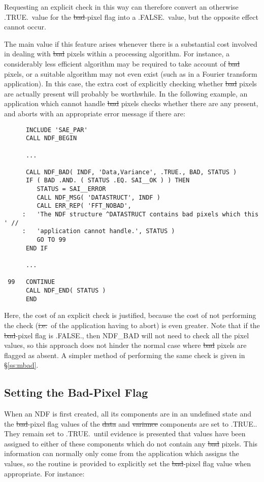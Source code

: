 Requesting an explicit check in this way can therefore convert an otherwise
.TRUE.\ value for the \st{bad\/}-pixel flag into a .FALSE.\ value, but the
opposite effect cannot occur. 

The main value if this feature arises whenever there is a substantial cost
involved in dealing with \st{bad\/} pixels within a processing algorithm. 
For instance, a considerably less efficient algorithm may be required to
take account of \st{bad\/} pixels, or a suitable algorithm may not even exist
(such as in a Fourier transform application).
In this case, the extra cost of explicitly checking whether \st{bad\/} pixels
are actually present will probably be worthwhile.
In the following example, an application which cannot handle \st{bad\/} 
pixels checks whether there are any present, and aborts with an appropriate 
error message if there are:

\small
\begin{verbatim}
      INCLUDE 'SAE_PAR'
      CALL NDF_BEGIN

      ...

      CALL NDF_BAD( INDF, 'Data,Variance', .TRUE., BAD, STATUS )
      IF ( BAD .AND. ( STATUS .EQ. SAI__OK ) ) THEN
         STATUS = SAI__ERROR
         CALL NDF_MSG( 'DATASTRUCT', INDF )
         CALL ERR_REP( 'FFT_NOBAD',
     :   'The NDF structure ^DATASTRUCT contains bad pixels which this ' //
     :   'application cannot handle.', STATUS )
         GO TO 99
      END IF

      ...

 99   CONTINUE
      CALL NDF_END( STATUS )
      END
\end{verbatim}
\normalsize

Here, the cost of an explicit check is justified, because the cost of not
performing the check (\st{i.e.}\ of the application having to abort) is even
greater. 
Note that if the \st{bad\/}-pixel flag is .FALSE., then NDF\_BAD will not
need to check all the pixel values, so this approach does not hinder the
normal case where \st{bad\/} pixels are flagged as absent. 
A simpler method of performing the same check is given in \S\ref{ss:mbad}. 

\subsection{\label{ss:settingbadpixflag}Setting the Bad-Pixel Flag}

When an NDF is first created, all its components are in an undefined state and
the \st{bad\/}-pixel flag values of the \st{data\/} and \st{variance\/} components
are set to .TRUE.. 
They remain set to .TRUE.\ until evidence is presented that values have been
assigned to either of these components which do not contain any \st{bad\/}
pixels. 
This information can normally only come from the application which assigns the
values, so the routine  is provided to explicitly set the \st{bad\/}-pixel flag value when appropriate. 
For instance:

